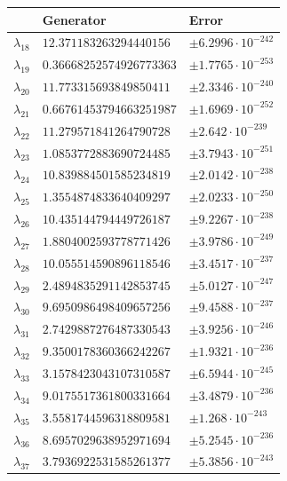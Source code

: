 \documentclass[a4paper,10pt]{article}
\begin{document}
\begin{appendix}
\begin{table}[h]
  \centering
  \begin{tabular}{|l|ll|}
  \hline
  {}             & Generator                & Error \\
  \hline
  $\lambda_{18}$ & $12.371183263294440156$  & $\pm 6.2996 \cdot 10^{-242}$ \\
  $\lambda_{19}$ & $0.36668252574926773363$ & $\pm 1.7765 \cdot 10^{-253}$ \\
  $\lambda_{20}$ & $11.773315693849850411$  & $\pm 2.3346 \cdot 10^{-240}$ \\
  $\lambda_{21}$ & $0.66761453794663251987$ & $\pm 1.6969 \cdot 10^{-252}$ \\
  $\lambda_{22}$ & $11.279571841264790728$  & $\pm 2.642 \cdot 10^{-239}$ \\
  $\lambda_{23}$ & $1.0853772883690724485$  & $\pm 3.7943 \cdot 10^{-251}$ \\
  $\lambda_{24}$ & $10.839884501585234819$  & $\pm 2.0142 \cdot 10^{-238}$ \\
  $\lambda_{25}$ & $1.3554874833640409297$  & $\pm 2.0233 \cdot 10^{-250}$ \\
  $\lambda_{26}$ & $10.435144794449726187$  & $\pm 9.2267 \cdot 10^{-238}$ \\
  $\lambda_{27}$ & $1.8804002593778771426$  & $\pm 3.9786 \cdot 10^{-249}$ \\
  $\lambda_{28}$ & $10.055514590896118546$  & $\pm 3.4517 \cdot 10^{-237}$ \\
  $\lambda_{29}$ & $2.4894835291142853745$  & $\pm 5.0127 \cdot 10^{-247}$ \\
  $\lambda_{30}$ & $9.6950986498409657256$  & $\pm 9.4588 \cdot 10^{-237}$ \\
  $\lambda_{31}$ & $2.7429887276487330543$  & $\pm 3.9256 \cdot 10^{-246}$ \\
  $\lambda_{32}$ & $9.3500178360366242267$  & $\pm 1.9321 \cdot 10^{-236}$ \\
  $\lambda_{33}$ & $3.1578423043107310587$  & $\pm 6.5944 \cdot 10^{-245}$ \\
  $\lambda_{34}$ & $9.0175517361800331664$  & $\pm 3.4879 \cdot 10^{-236}$ \\
  $\lambda_{35}$ & $3.5581744596318809581$  & $\pm 1.268 \cdot 10^{-243}$ \\
  $\lambda_{36}$ & $8.6957029638952971694$  & $\pm 5.2545 \cdot 10^{-236}$ \\
  $\lambda_{37}$ & $3.7936922531585261377$  & $\pm 5.3856 \cdot 10^{-243}$ \\

\end{tabular}
\end{table}
\end{appendix}
\end{document}
